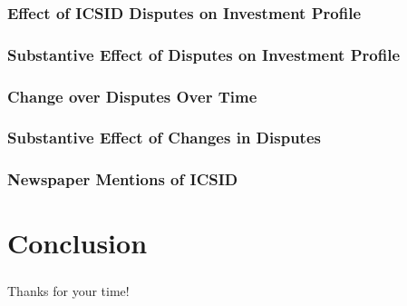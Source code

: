 \documentclass[10pt]{beamer}
\begin{document}
\begin{frame}
\frametitle{Effect of ICSID Disputes on Investment Profile}

\begin{figure}[ht]
	\centering
	\vspace{-5mm}	
	\resizebox{1\textwidth}{!}{}
\end{figure}

\end{frame}

\begin{frame}
\frametitle{Substantive Effect of Disputes on Investment Profile}

\begin{figure}[ht]
	\centering
	\resizebox{1\textwidth}{!}{}	
\end{figure}

\end{frame}

\begin{frame}
\frametitle{Change over Disputes Over Time}

\begin{figure}[ht]
	\centering
	\resizebox{1\textwidth}{!}{}	
\end{figure}

\end{frame}

\begin{frame}
\frametitle{Substantive Effect of Changes in Disputes}

\begin{figure}[ht]
	\centering
	\resizebox{1\textwidth}{!}{}	
\end{figure}

\end{frame}

\begin{frame}
\frametitle{Newspaper Mentions of ICSID}

\begin{figure}[ht]
	\centering
	\resizebox{1\textwidth}{!}{}
\end{figure}

\end{frame}

\section{Conclusion}

\begin{frame}
\frametitle{}

\begin{center}
Thanks for your time!
\end{center}

\end{frame}
\end{document}
